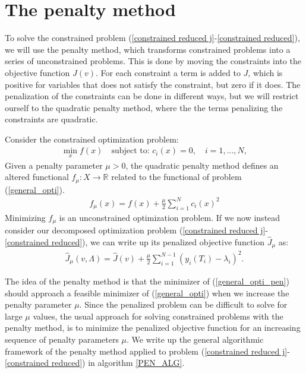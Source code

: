 \section{The penalty method} \label{penalty_sec}
To solve the constrained problem (\ref{constrained reduced j}-\ref{constrained reduced}), we will use the penalty method\cite{nocedal2006numerical}, which transforms constrained problems into a series of unconstrained problems. This is done by moving the constraints into the objective function $J(v)$. For each constraint a term is added to $J$, which is positive for variables that does not satisfy the constraint, but zero if it does. The penalization of the constraints can be done in different ways, but we will restrict ourself to the quadratic penalty method, where the the terms penalizing the constraints are quadratic. 
\begin{definition}\label{QuadPenMethDef}
Consider the constrained optimization problem:
\begin{align}
\min_x f(x)\quad\textrm{subject to: } c_i(x)=0,\quad i=1,...,N, \label{general_opti}
\end{align}
Given a penalty parameter $\mu>0$, the quadratic penalty method defines an altered functional $f_{\mu}:X\rightarrow\mathbb{R}$ related to the functional of problem (\ref{general_opti}).
\begin{align}
f_{\mu}(x) = f(x) +\frac{\mu }{2}\sum_{i=1}^Nc_i(x)^2 \label{general_opti_pen}
\end{align}
Minimizing $f_{\mu}$ is an unconstrained optimization problem. If we now instead consider our decomposed optimization problem (\ref{constrained reduced j}-\ref{constrained reduced}), we can write up its penalized objective function $\hat J_{\mu}$ as:
\begin{align}
\hat J_{\mu}(v,\Lambda) = \hat J(v) + \frac{\mu}{2}\sum_{i=1}^{N-1}(y_{i}(T_i)-\lambda_i)^2. \label{pen_obj_J}
\end{align}
\end{definition}
\noindent
The idea of the penalty method is that the minimizer of (\ref{general_opti_pen}) should approach a feasible minimizer of (\ref{general_opti}) when we increase the penalty parameter $\mu$. Since the penalized problem can be difficult to solve for large $\mu$ values, the usual approach for solving constrained problems with the penalty method, is to minimize the penalized objective function for an increasing sequence of penalty parameters $\mu$. We write up the general algorithmic framework of the penalty method applied to problem (\ref{constrained reduced j}-\ref{constrained reduced}) in algorithm \ref{PEN_ALG}. 
